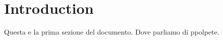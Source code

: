 
    \section{Introduction}
    Questa e la prima sezione del documento. Dove parliamo di ppolpete.

